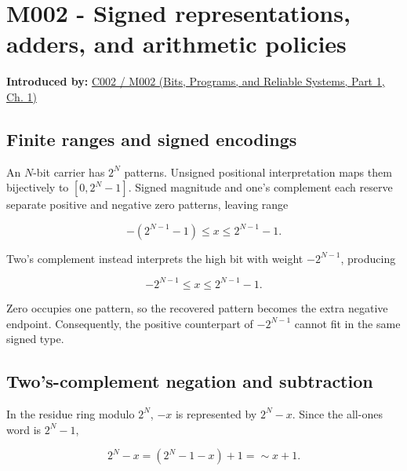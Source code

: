 \section{M002 - Signed representations, adders, and arithmetic policies}\label{03-visual-computing-i-ch018-m002---signed-representations-adders-and-arithmetic-policies}

\hypertarget{03-visual-computing-i-ch018-m002---signed-representations-adders-and-arithmetic-policies}{}

\textbf{Introduced by:} \href{../01-Bits-Programs-and-Reliable-Systems-P01/main.pdf\#nameddest=01-foundations-i-ch001-arithmetic-becomes-a-policy}{C002 / M002 (Bits, Programs, and Reliable Systems, Part 1, Ch. 1)}

\subsection{Finite ranges and signed encodings}\label{03-visual-computing-i-ch018-finite-ranges-and-signed-encodings}

\hypertarget{03-visual-computing-i-ch018-finite-ranges-and-signed-encodings}{}

An \(N\)-bit carrier has \(2^N\) patterns. Unsigned positional interpretation maps them bijectively to \([0,2^N-1]\). Signed magnitude and one's complement each reserve separate positive and negative zero patterns, leaving range

\[
-(2^{N-1}-1)\le x\le2^{N-1}-1.
\]

Two's complement instead interprets the high bit with weight \(-2^{N-1}\), producing

\[
-2^{N-1}\le x\le2^{N-1}-1.
\]

Zero occupies one pattern, so the recovered pattern becomes the extra negative endpoint. Consequently, the positive counterpart of \(-2^{N-1}\) cannot fit in the same signed type.

\subsection{Two's-complement negation and subtraction}\label{03-visual-computing-i-ch018-twos-complement-negation-and-subtraction}

\hypertarget{03-visual-computing-i-ch018-twos-complement-negation-and-subtraction}{}

In the residue ring modulo \(2^N\), \(-x\) is represented by \(2^N-x\). Since the all-ones word is \(2^N-1\),

\[
2^N-x=(2^N-1-x)+1=\sim x+1.
\]

